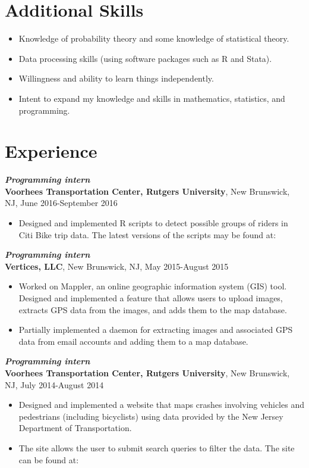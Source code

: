 \documentclass[12pt]{article}
\begin{document}
\section*{Additional Skills}

\begin{itemize}
\item
Knowledge of probability theory and some knowledge of statistical theory.
\item
Data processing skills (using software packages such as R and Stata).
\item
Willingness and ability to learn things independently.
\item
Intent to expand my knowledge and skills in mathematics, statistics, and programming.
\end{itemize}

\section*{Experience}

\textit{\textbf{Programming intern}} \\
\textbf{Voorhees Transportation Center, Rutgers University}, New Brunswick, NJ, June 2016-September 2016
\begin{itemize}
\item
Designed and implemented R scripts to detect possible groups of riders in Citi Bike trip data. The latest versions of the scripts may be found at:

\end{itemize}

\textit{\textbf{Programming intern}} \\
\textbf{Vertices, LLC}, New Brunswick, NJ, May 2015-August 2015
\begin{itemize}
\item
Worked on Mappler, an online geographic information system (GIS) tool. Designed and implemented a feature that allows users to upload images, extracts GPS data from the images, and adds them to the map database.
\item
Partially implemented a daemon for extracting images and associated GPS data from email accounts and adding them to a map database.
\end{itemize}

\textit{\textbf{Programming intern}} \\
\textbf{Voorhees Transportation Center, Rutgers University}, New Brunswick, NJ, July 2014-August 2014
\begin{itemize}
\item
Designed and implemented a website that maps crashes involving vehicles and pedestrians (including bicyclists) using data provided by the New Jersey Department of Transportation.
\item
The site allows the user to submit search queries to filter the data. The site can be found at:

\end{itemize}
\end{document}
